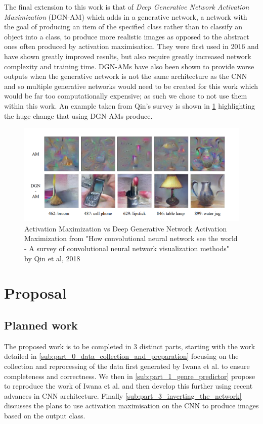 \documentclass[12pt]{article}
\numberwithin{equation}{section}
\numberwithin{figure}{section}
\begin{document}
The final extension to this work is that of \emph{Deep Generative Network Activation Maximization} (DGN-AM)\cite{Nguyena} which adds in a generative network, a network with the goal of producing an item of the specified class rather than to classify an object into a class, to produce more realistic images as opposed to the abstract ones often produced by activation maximisation. They were first used in 2016 and have shown greatly improved results, but also require greatly increased network complexity and training time. DGN-AMs have also been shown to provide worse outputs when the generative network is not the same architecture as the CNN and so multiple generative networks would need to be created for this work which would be far too computationally expensive; as such we chose to not use them within this work. An example taken from Qin's survey is shown in \cref{fig:am_dgnam} highlighting the huge change that using DGN-AMs produce. 

\begin{figure}
	\centering
	\captionsetup{justification=centering}
	\includegraphics[scale=0.4]{am_vs_dgnam.PNG}
	\caption{Activation Maximization vs Deep Generative Network Activation Maximization from "How convolutional neural network see the world - A survey of convolutional neural network visualization methods" by Qin et al, 2018}
	\label{fig:am_dgnam}
\end{figure}
\section{Proposal} %
\label{sec:proposal}
\subsection{Planned work}
The proposed work is to be completed in 3 distinct parts, starting with the work detailed in \cref{sub:part_0_data_collection_and_preparation} focusing on the collection and reprocessing of the data first generated by Iwana et al. \cite{KenjiIwana} to ensure completeness and correctness. We then in \cref{sub:part_1_genre_predictor} propose to reproduce the work of Iwana et al. and then develop this further using recent advances in CNN architecture. Finally \cref{sub:part_3_inverting_the_network} discusses the plans to use activation maximisation on the CNN to produce images based on the output class.
\end{document}
